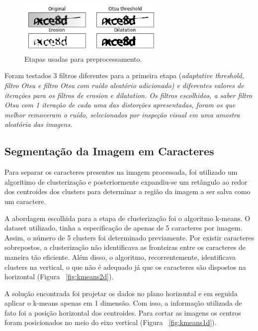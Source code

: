 \documentclass[11pt]{article}
\begin{document}
  \begin{figure}[H]
        {\centering
        \includegraphics[width=70mm]{images/preproc.png}
        \caption{Etapas usadas para preprocessamento.}
        \label{fig:preproc}\par}
  \end{figure}

Foram testados 3 filtros diferentes para a primeira etapa (\em adaptative threshold\em , filtro Otsu e filtro Otsu com ruído aleatório adicionado) e diferentes valores de iterações para os filtros de \em erosion \em e \em dilatation\em . Os filtros escolhidos, a saber filtro Otsu com 1 iteração de cada uma das distorções apresentadas, foram os que melhor removeram o ruído, selecionados por inspeção visual em uma amostra aleatória das imagens.


\subsection{Segmentação da Imagem em Caracteres}
\label{sec:cluteri}

Para separar os caracteres presentes na imagem processada, foi utilizado um algoritimo de clusterização e posteriormente expandiu-se um retângulo ao redor dos centroides dos clusters para determinar a região da imagem a ser salva como um caractere.

A abordagem escolhida para a etapa de clusterização foi o algoritmo k-means. O dataset utilizado, tinha a especificação de apenas de 5 caracteres por imagem. Assim, o número de 5 clusters foi determinado previamente. Por existir caracteres sobrepostos, a clusterização não identificava as fronteiras entre os caracteres de maneira tão eficiente. Além disso, o algoritmo, recorrentemente, identificava clusters na vertical, o que não é adequado já que os caracteres são dispostos na horizontal (Figura ~\ref{fig:kmeans2d}). 

A solução encontrada foi projetar os dados no plano horizontal e em seguida aplicar o k-means apenas em 1 dimensão. Com isso, a informação utilizada de fato foi a posição horizontal dos centroides. Para cortar as imagens os centros foram posicionados no meio do eixo vertical (Figura ~\ref{fig:kmeans1d}).
\end{document}

